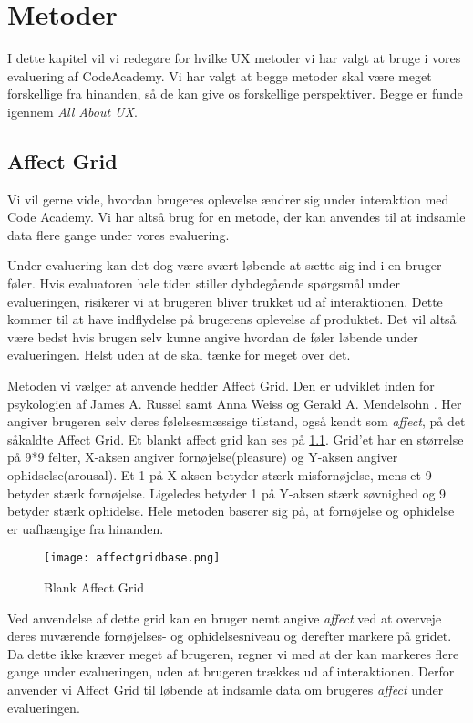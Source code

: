 \chapter{Metoder}\label{ch:met}
I dette kapitel vil vi redegøre for hvilke UX metoder vi har valgt at bruge i vores evaluering af CodeAcademy. Vi har valgt at begge metoder skal være meget forskellige fra hinanden, så de kan give os forskellige perspektiver. Begge er funde igennem \textit{All About UX}\cite{AllAboutUX}.


\section{Affect Grid}\label{sec:AG}
Vi vil gerne vide, hvordan brugeres oplevelse ændrer sig under interaktion med Code Academy. Vi har altså brug for en metode, der kan anvendes til at indsamle data flere gange under vores evaluering. 

Under evaluering kan det dog være svært løbende at sætte sig ind i en bruger føler. Hvis evaluatoren hele tiden stiller dybdegående spørgsmål under evalueringen, risikerer vi at brugeren bliver trukket ud af interaktionen. Dette kommer til at have indflydelse på brugerens oplevelse af produktet. Det vil altså være bedst hvis brugen selv kunne angive hvordan de føler løbende under evalueringen. Helst uden at de skal tænke for meget over det. 

Metoden vi vælger at anvende hedder Affect Grid. Den er udviklet inden for psykologien af James A. Russel samt Anna Weiss og Gerald A. Mendelsohn \cite{AffectGrid}. Her angiver brugeren selv deres følelsesmæssige tilstand, også kendt som \textit{affect}, på det såkaldte Affect Grid. Et blankt affect grid kan ses på \cref{fig:affectgrid}. Grid'et har en størrelse på 9*9 felter, X-aksen angiver fornøjelse(pleasure) og Y-aksen angiver ophidselse(arousal). Et 1 på X-aksen betyder stærk misfornøjelse, mens et 9 betyder stærk fornøjelse. Ligeledes betyder 1 på Y-aksen stærk søvnighed og 9 betyder stærk ophidelse. Hele metoden baserer sig på, at fornøjelse og ophidelse er uafhængige  fra hinanden. 

\begin{figure}[h]
\centering
\texttt{[image: affectgridbase.png]}
\caption{Blank Affect Grid}
\label{fig:affectgrid}
\end{figure}

Ved anvendelse af dette grid kan en bruger nemt angive \textit{affect} ved at overveje deres nuværende fornøjelses- og ophidelsesniveau og derefter markere på gridet. Da dette ikke kræver meget af brugeren, regner vi med at der kan markeres flere gange under evalueringen, uden at brugeren trækkes ud af interaktionen. Derfor anvender vi Affect Grid til løbende at indsamle data om brugeres \textit{affect} under evalueringen.


